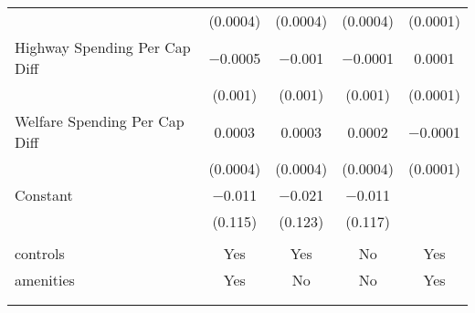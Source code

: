\begin{table}[!htbp]
\begin{tabular}{@{\extracolsep{5pt}}lcccc}
  & (0.0004) & (0.0004) & (0.0004) & (0.0001) \\ 
  Highway Spending Per Cap Diff & $-$0.0005 & $-$0.001 & $-$0.0001 & 0.0001 \\ 
  & (0.001) & (0.001) & (0.001) & (0.0001) \\ 
  Welfare Spending Per Cap Diff & 0.0003 & 0.0003 & 0.0002 & $-$0.0001 \\ 
  & (0.0004) & (0.0004) & (0.0004) & (0.0001) \\ 
  Constant & $-$0.011 & $-$0.021 & $-$0.011 &  \\ 
  & (0.115) & (0.123) & (0.117) &  \\ 
 \hline \\[-1.8ex] 
controls & Yes & Yes & No & Yes \\ 
amenities & Yes & No & No & Yes \\ 
\hline \\[-1.8ex] 
\hline 
\hline \\[-1.8ex] 
\end{tabular} 
\end{table} 
